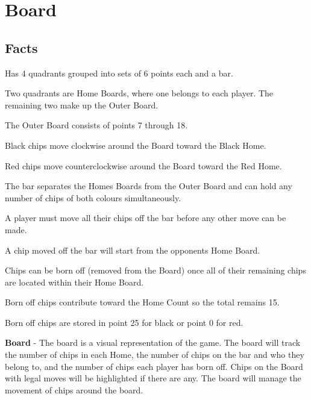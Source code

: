 \section{Board}

\subsection{Facts}

\begin{dashed}
    \item Has 4 quadrants grouped into sets of 6 points each and a bar.
    \item Two quadrants are Home Boards, where one belongs to each player. The remaining two make up         the Outer Board.
    \item The Outer Board consists of points 7 through 18.
    \item Black chips move clockwise around the Board toward the Black Home.
    \item Red chips move counterclockwise around the Board toward the Red Home.
    \item The bar separates the Homes Boards from the Outer Board and can hold any number of chips of        both colours simultaneously.
    \item A player must move all their chips off the bar before any other move can be made.
    \item A chip moved off the bar will start from the opponents Home Board.
    \item Chips can be born off (removed from the Board) once all of their remaining chips are located       within their Home Board.
    \item Born off chips contribute toward the Home Count so the total remains 15.
    \item Born off chips are stored in point 25 for black or point 0 for red.
\end{dashed}

\noindent
\newline\textbf{Board} - The board is a visual representation of the game. The board will track the number of chips in each Home, the number of chips on the bar and who they belong to, and the number of chips each player has born off. Chips on the Board with legal moves will be highlighted if there are any. The board will manage the movement of chips around the board.

